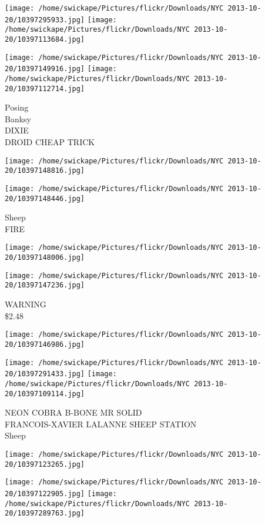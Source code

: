 \documentclass[10pt,letterpaper]{article}
\begin{document}
\texttt{[image: /home/swickape/Pictures/flickr/Downloads/NYC 2013-10-20/10397295933.jpg]}
\texttt{[image: /home/swickape/Pictures/flickr/Downloads/NYC 2013-10-20/10397113684.jpg]}

\texttt{[image: /home/swickape/Pictures/flickr/Downloads/NYC 2013-10-20/10397149916.jpg]}
\texttt{[image: /home/swickape/Pictures/flickr/Downloads/NYC 2013-10-20/10397112714.jpg]}

Posing\\
Banksy\\
DIXIE\\
DROID CHEAP TRICK
\pagebreak

\texttt{[image: /home/swickape/Pictures/flickr/Downloads/NYC 2013-10-20/10397148816.jpg]}

\vspace{0.25in}
\texttt{[image: /home/swickape/Pictures/flickr/Downloads/NYC 2013-10-20/10397148446.jpg]}

Sheep\\
FIRE
\pagebreak

\texttt{[image: /home/swickape/Pictures/flickr/Downloads/NYC 2013-10-20/10397148006.jpg]}

\vspace{0.25in}
\texttt{[image: /home/swickape/Pictures/flickr/Downloads/NYC 2013-10-20/10397147236.jpg]}

WARNING\\
\$2.48
\pagebreak

\texttt{[image: /home/swickape/Pictures/flickr/Downloads/NYC 2013-10-20/10397146986.jpg]}

\vspace{0.25in}
\texttt{[image: /home/swickape/Pictures/flickr/Downloads/NYC 2013-10-20/10397291433.jpg]}
\texttt{[image: /home/swickape/Pictures/flickr/Downloads/NYC 2013-10-20/10397109114.jpg]}

NEON COBRA B{-}BONE MR SOLID\\
FRANCOIS{-}XAVIER LALANNE SHEEP STATION\\
Sheep
\pagebreak

\texttt{[image: /home/swickape/Pictures/flickr/Downloads/NYC 2013-10-20/10397123265.jpg]}

\vspace{0.25in}
\texttt{[image: /home/swickape/Pictures/flickr/Downloads/NYC 2013-10-20/10397122905.jpg]}
\texttt{[image: /home/swickape/Pictures/flickr/Downloads/NYC 2013-10-20/10397289763.jpg]}
\end{document}
